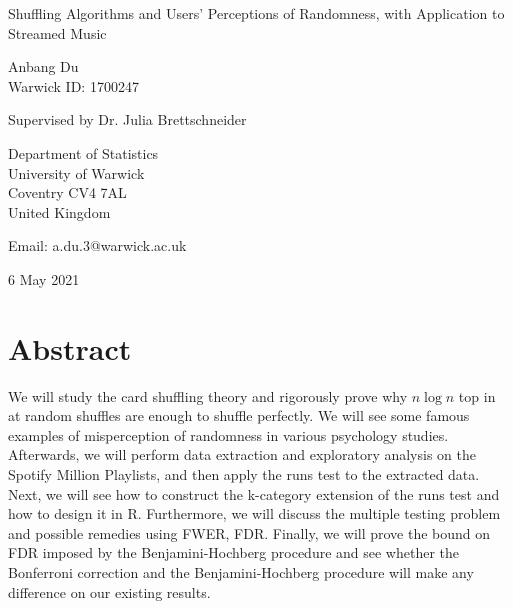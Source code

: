 \documentclass[12pt]{article}
\theoremstyle{plain}
\theoremstyle{definition}
\theoremstyle{remark}
\begin{document}
\thispagestyle{empty}
\begin{center}
{\Huge Shuffling Algorithms and Users’ Perceptions of Randomness, with Application to Streamed Music

\bigskip
\bigskip


\bigskip
\bigskip

\huge Anbang Du\\
\vspace{5pt}
\huge Warwick ID: 1700247\\
\bigskip
\bigskip
\bigskip


\LARGE Supervised by Dr. Julia Brettschneider}
\end{center}
\vfill

\begin{center}
{\Large
Department of Statistics\\
University of Warwick\\
Coventry CV4 7AL\\
United Kingdom\\
\medskip

Email: a.du.3@warwick.ac.uk \\
\medskip

6 May 2021 }
\end{center}
\bigskip

\newpage

\hfill

\hfill

\hfill

\hfill

\section*{Abstract}
We will study the card shuffling theory and rigorously prove why $n\log n$ top in at random shuffles are enough to shuffle perfectly. We will see some famous examples of misperception of randomness in various psychology studies. Afterwards, we will perform data extraction and exploratory analysis on the Spotify Million Playlists, and then apply the runs test to the extracted data. Next, we will see how to construct the k-category extension of the runs test and how to design it in R. Furthermore, we will discuss the multiple testing problem and possible remedies using FWER, FDR. Finally, we will prove the bound on FDR imposed by the Benjamini-Hochberg procedure and see whether the Bonferroni correction and the Benjamini-Hochberg procedure will make any difference on our existing results.
\end{document}
